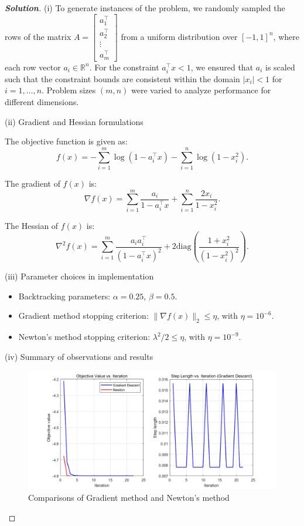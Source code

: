 \documentclass[11pt]{article}
\newenvironment{solution}
  {\renewcommand\qedsymbol{$\square$}\begin{proof}[\textbf{Solution}]}
  {\end{proof}}
\begin{document}
\begin{solution}
(i)
To generate instances of the problem, we randomly sampled the rows of the matrix $A = \begin{bmatrix} a_1^\top \\ a_2^\top \\ \vdots \\ a_m^\top \end{bmatrix}$ from a uniform distribution over $[-1, 1]^n$, where each row vector $a_i \in \mathbb{R}^n$. For the constraint $a_i^\top x < 1$, we ensured that $a_i$ is scaled such that the constraint bounds are consistent within the domain $|x_i| < 1$ for $i = 1, \ldots, n$. Problem sizes $(m, n)$ were varied to analyze performance for different dimensions.

(ii) {Gradient and Hessian formulations}

The objective function is given as:
\[
    f(x) = - \sum_{i=1}^m \log(1 - a_i^\top x) - \sum_{i=1}^n \log(1 - x_i^2).
\]

The gradient of $f(x)$ is:
\[
    \nabla f(x) = \sum_{i=1}^m \frac{a_i}{1 - a_i^\top x} + \sum_{i=1}^n \frac{2x_i}{1 - x_i^2}.
\]

The Hessian of $f(x)$ is:
\[
    \nabla^2 f(x) = \sum_{i=1}^m \frac{a_i a_i^\top}{(1 - a_i^\top x)^2} + 2 \text{diag}\left( \frac{1 + x_i^2}{(1 - x_i^2)^2} \right).
\]

(iii) {Parameter choices in implementation}

\begin{itemize}
    \item Backtracking parameters: $\alpha = 0.25$, $\beta = 0.5$.
    \item Gradient method stopping criterion: $\|\nabla f(x)\|_2 \leq \eta$, with $\eta = 10^{-6}$.
    \item Newton's method stopping criterion: $\lambda^2 / 2 \leq \eta$, with $\eta = 10^{-9}$.
\end{itemize}

(iv) {Summary of observations and results}

\begin{figure}[htb]
  \centering
  \includegraphics[width=0.9\columnwidth]{"HW5_P6.png"}
  \caption{Comparisons of Gradient method and Newton's method}
  \label{fig:p6}
\end{figure}


\end{solution}
\end{document}
